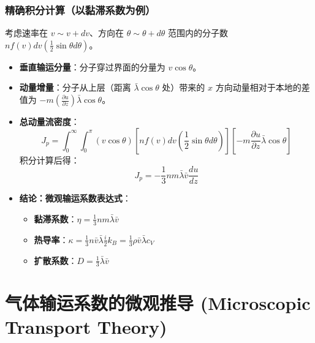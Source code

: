 \documentclass{article}
\begin{document}
\subsubsection{精确积分计算（以黏滞系数为例）}
考虑速率在 $v \sim v+dv$、方向在 $\theta \sim \theta+d\theta$ 范围内的分子数 $nf(v)dv (\frac{1}{2}\sin\theta d\theta)$。
\begin{itemize}
    \item \textbf{垂直输运分量}：分子穿过界面的分量为 $v \cos\theta$。
    \item \textbf{动量增量}：分子从上层（距离 $\bar{\lambda}\cos\theta$ 处）带来的 $x$ 方向动量相对于本地的差值为 $-m \left(\frac{\partial u}{\partial z}\right) \allowbreak \bar{\lambda} \cos\theta$。
    \item \textbf{总动量流密度}：
    \[ J_p = \int_0^\infty \int_0^\pi (v \cos\theta) [nf(v)dv (\frac{1}{2}\sin\theta d\theta)] \left[ -m \frac{\partial u}{\partial z} \bar{\lambda} \cos\theta \right] \]
    积分计算后得：
    \[ J_p = -\frac{1}{3} nm \bar{\lambda} \bar{v} \frac{du}{dz} \]
    \item \textbf{结论：微观输运系数表达式}：
    \begin{itemize}
        \item \textbf{黏滞系数}：$\eta = \frac{1}{3} nm \bar{\lambda} \bar{v}$
        \item \textbf{热导率}：$\kappa = \frac{1}{3} n \bar{v} \bar{\lambda} \frac{i}{2}k_B = \frac{1}{3} \rho \bar{v} \bar{\lambda} c_V$
        \item \textbf{扩散系数}：$D = \frac{1}{3} \bar{\lambda} \bar{v}$
    \end{itemize}
\end{itemize}

\section{气体输运系数的微观推导 (Microscopic Transport Theory)}
\end{document}
